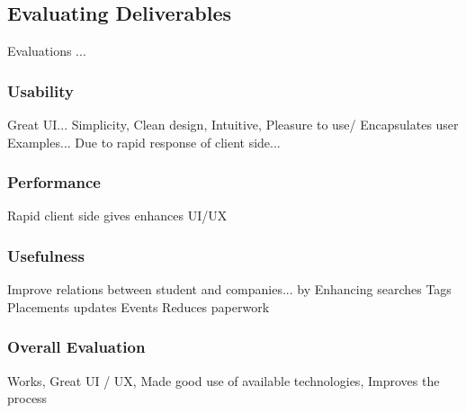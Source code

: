 \subsection{Evaluating Deliverables}
Evaluations ...
	\subsubsection{Usability}
		Great UI... Simplicity, Clean design, Intuitive, Pleasure to use/ Encapsulates user
		Examples...
		Due to rapid response of client side...
	\subsubsection{Performance}
		Rapid client side gives enhances UI/UX
	\subsubsection{Usefulness}
		Improve relations between student and companies...
		by Enhancing searches
		Tags
		Placements updates
		Events
		Reduces paperwork
	\subsubsection{Overall Evaluation}
		Works, Great UI / UX, Made good use of available technologies, Improves the process
